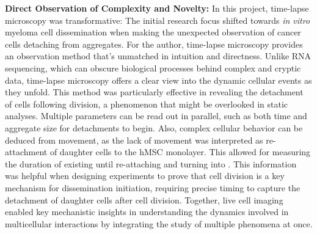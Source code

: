 
\textbf{Direct Observation of Complexity and Novelty:} In this project,
time-lapse microscopy was transformative: The initial research focus shifted
towards \textit{in vitro} myeloma cell dissemination when making the unexpected
 observation of cancer cells
detaching from aggregates. For the author, time-lapse microscopy provides an
observation method that's unmatched in intuition and directness. Unlike RNA
sequencing, which can obscure biological processes behind complex and cryptic
data, time-lapse microscopy offers a clear view into the dynamic cellular events
as they unfold. This method was particularly effective in revealing the
detachment of cells following division, a phenomenon that might be overlooked in
static analyses. Multiple parameters can be read out in parallel, such as both
time and aggregate size for detachments to begin. Also, complex cellular
behavior can be deduced from movement, as the lack of movement was interpreted
as re-attachment of \INA daughter cells to the \ac{hMSC} monolayer. This
allowed for measuring the duration of \nMAina existing until re-attaching and
turning into \MAina. This information was helpful when designing experiments to
prove that cell division is a key mechanism for dissemination initiation,
requiring precise timing to capture the detachment of daughter cells after cell
division. Together, live cell imaging enabled key mechanistic insights in
understanding the dynamics involved in multicellular interactions by integrating
the study of multiple phenomena at once.

